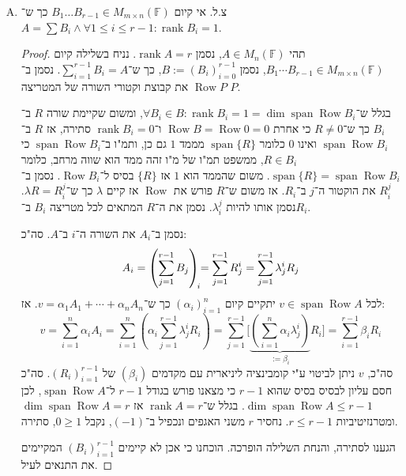 \documentclass[]{article}
\newcommand\F         {\mathbb{F}}
\newcommand\co        {\colon}
\DeclareMathOperator{\Sp}     {span}
\DeclareMathOperator{\rk}     {rank}
\DeclareMathOperator{\rows}   {Row}
\newcommand\ag        {\alpha}
\newcommand\bg        {\beta}
\renewcommand\lg      {\lambda}
\newcommand\cl [1]    {\left ( #1 \right )}
\begin{document}
\begin{enumerate}[A)]
\begin{proof}
\begin{itemize}
\begin{itemize}
\begin{enumerate}
					\end{enumerate}
				\end{itemize}
				סה"כ הוכחנו שאכן לסכום שוויון ל־$A$, וה־$\rk$ של כל מטריצה בסכום הוא $1$. 
			\end{itemize}
			משהוכח לעיל ובגלל ש־$|(P_i)_{i = 0}^r| = r$, הוכחנו את הדרוש, ו־$(P_i)$ הסדרה המבוקשת. 			
		\end{proof}
		\item צ.ל. אי קיום $B_1 \dots B_{r - 1} \in M_{m \times n}(\F)$ כך ש־$A = \sum B_i \land \forall 1 \le i \le r - 1 \co \rk B_i = 1$. 
		\begin{proof}
			תהי $A \in M_n(\F)$, נסמן $\rk A = r$. נניח בשלילה קיום $B_1 \cdots B_{r - 1} \in M_{m \times n}(\F)$, נסמן $B := (B_i)_{i = 0}^{r - 1}$, כך ש־$\sum_{i =1}^{r - 1}B_i = A$. 
	נסמן ב־$\rows P$ את קבוצת וקטורי השורה של המטריצה $P$. 
	
	בגלל ש־$\forall B_i \in B \co \rk B_i = 1 = \dim \Sp \rows B_i$, ומשום שקיימת שורה $R$ ב־$B_i$ כך ש־$R \neq 0$ כי אחרת $\rows B = \rows 0 = 0$ ו־$\rk B_i = 0$ סתירה, אז $R$ ב־$\Sp \rows B_i$ ואינו $0$ כלומר $\Sp\{R\}$ מממד $1$ גם כן, ותמ"ו ב־$\Sp\rows B_i$ כי $R \in B_i$, ממשפט תמ"ו של מ"ו זהה ממד הוא שווה מרחב, כלומר $\Sp \{R\} = \Sp \rows B_i$. משום שהממד הוא $1$ אז $\{R\}$ בסיס ל־$\rows B_i$. נסמן ב־$R^j_i$ את הוקטור ה־$j$ ב־$R_i$. אז משום ש־$R$ פורש את $\rows$ אז קיים $\lg$ כך ש־$\lg R = R^j_i$. נסמן אותו להיות $\lg_i^j$. נסמן את ה־$R$ המתאים לכל מטריצה $B_i$ ב־$R_i$. 
	
	נסמן ב־$A_i$ את השורה ה־$i$ ב־$A$. סה"כ: 
	\[ A_i = \cl{\sum_{j = 1}^{r - 1}B_j}_{\mathclap{i}} \!= \sum_{j = 1}^{r - 1}R^i_j = \sum_{j = 1}^{r - 1} \lg^{i}_jR_j \]
	לכל $v \in \Sp \rows A$ יתקיים קיום $(\ag_i)_{i = 1}^{n}$ כך ש־$v = \ag_1 A_1 + \cdots + \ag_nA_n$. אז: 
	\[ v = \sum_{i = 1}^{n}\ag_iA_i = \sum_{i = 1}^{n}\cl{\ag_i\sum_{j = 1}^{r - 1}\lg^{i}_jR_i}
	=\sum_{j = 1}^{r - 1}\Bigg[\underbrace{\cl{\sum_{i = 1}^{n}\ag_i\lg^i_j}}_{:= \bg_i}R_i \Bigg] = \sum_{i = 1}^{r - 1}\bg_iR_i
	 \]
	 סה"כ, $v$ ניתן לביטוי ע"י קומבינציה ליניארית עם מקדמים $(\bg_i)$ של $(R_i)_{i = 1}^{r - 1}$. סה"כ חסם עליון לבסיס בסיס שהוא $r - 1$ כי מצאנו פורש בגודל $r -1$ ל־$\Sp\rows A$, לכן $\dim \Sp\rows A \le r - 1$. בגלל ש־$\rk A = r$ אז $\dim \Sp \rows A =r$ ומטרנזיטיביות $r \le r - 1$. נחסיר $r$ משני האגפים ונכפיל ב־$(-1)$, נקבל $0 \ge 1$, סתירה. 
	 
	 הגענו לסתירה, והנחת השלילה הופרכה. הוכחנו כי אכן לא קיימים $(B_i)_{i = 1}^{r - 1}$ המקיימים את התנאים לעיל. 
		\end{proof}
	\end{enumerate}
	
\end{document}
